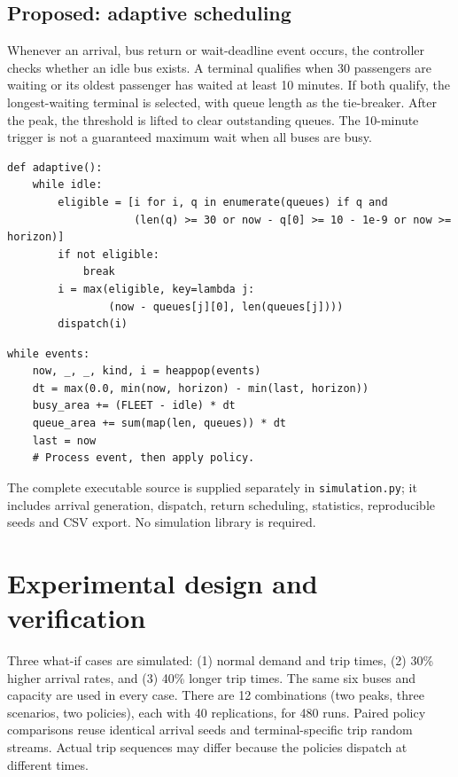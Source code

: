 \documentclass[conference]{IEEEtran}
\begin{document}
\subsection{Proposed: adaptive scheduling}
Whenever an arrival, bus return or wait-deadline event occurs, the controller checks whether an idle bus exists. A terminal qualifies when 30 passengers are waiting or its oldest passenger has waited at least 10 minutes. If both qualify, the longest-waiting terminal is selected, with queue length as the tie-breaker. After the peak, the threshold is lifted to clear outstanding queues. The 10-minute trigger is not a guaranteed maximum wait when all buses are busy.
\begin{lstlisting}[caption={Core demand-responsive dispatch rule}]
def adaptive():
    while idle:
        eligible = [i for i, q in enumerate(queues) if q and
                    (len(q) >= 30 or now - q[0] >= 10 - 1e-9 or now >= horizon)]
        if not eligible:
            break
        i = max(eligible, key=lambda j:
                (now - queues[j][0], len(queues[j])))
        dispatch(i)
\end{lstlisting}
\begin{lstlisting}[caption={Event-calendar processing (excerpt)}]
while events:
    now, _, _, kind, i = heappop(events)
    dt = max(0.0, min(now, horizon) - min(last, horizon))
    busy_area += (FLEET - idle) * dt
    queue_area += sum(map(len, queues)) * dt
    last = now
    # Process event, then apply policy.
\end{lstlisting}
The complete executable source is supplied separately in \texttt{simulation.py}; it includes arrival generation, dispatch, return scheduling, statistics, reproducible seeds and CSV export. No simulation library is required.
\section{Experimental design and verification}
Three what-if cases are simulated: (1) normal demand and trip times, (2) 30\% higher arrival rates, and (3) 40\% longer trip times. The same six buses and capacity are used in every case. There are 12 combinations (two peaks, three scenarios, two policies), each with 40 replications, for 480 runs. Paired policy comparisons reuse identical arrival seeds and terminal-specific trip random streams. Actual trip sequences may differ because the policies dispatch at different times.
\end{document}
